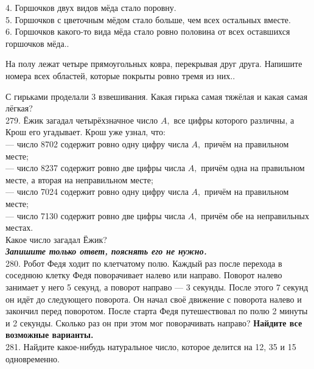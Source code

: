 4. Горшочков двух видов мёда стало поровну.\\
5. Горшочков с цветочным мёдом стало больше, чем всех остальных вместе.\\
6. Горшочков какого-то вида мёда стало ровно половина от всех оставшихся горшочков мёда.\newpage{}. \begin{center}
\begin{figure}[ht!]
\end{figure}
\end{center}
На полу лежат четыре прямоугольных ковра, перекрывая друг друга. Напишите номера всех областей, которые покрыты ровно тремя из них.\newpage{}. \begin{center}
\begin{figure}[ht!]
\end{figure}
\end{center}
С гирьками проделали 3 взвешивания. Какая гирька самая тяжёлая и какая самая лёгкая?\\
279. Ёжик загадал четырёхзначное число $A,$ все цифры которого различны, а Крош его угадывает. Крош уже узнал, что:\\
 --- число 8702 содержит ровно одну цифру числа $A,$ причём на правильном месте;\\
 --- число 8237 содержит ровно две цифры числа $A,$ причём одна на правильном месте, а вторая на неправильном месте;\\
 --- число 7024 содержит ровно одну цифру числа $A,$ причём на правильном месте;\\
 --- число 7130 содержит ровно две цифры числа $A,$ причём обе на неправильных местах.\\
 Какое число загадал Ёжик?\\
  {\it {\textbf {Запишите только ответ, пояснять его не нужно.}}}\\
280. Робот Федя ходит по клетчатому полю. Каждый раз после перехода в соседнюю клетку Федя поворачивает налево или направо. Поворот налево занимает у него 5 секунд, а поворот направо --- 3 секунды. После этого 7 секунд он идёт до следующего поворота. Он начал своё движение с поворота налево и закончил перед поворотом. После старта Федя путешествовал по полю 2 минуты и 2 секунды. Сколько раз он при этом мог поворачивать направо? {\textbf {Найдите все возможные варианты.}}\\
281. Найдите какое-нибудь натуральное число, которое делится на 12, 35 и 15 одновременно.\\

